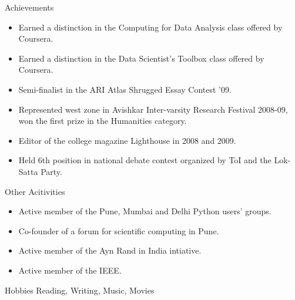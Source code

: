 \documentclass{resume} %
\begin{document}
\begin{rSection}{Achievements}
    \begin{itemize}
        \item Earned a distinction in the Computing for Data Analysis class
            offered by Coursera.
        \item Earned a distinction in the Data Scientist’s Toolbox class
            offered by Coursera.
        \item Semi-finalist in the ARI Atlas Shrugged Essay Contest ’09.
        \item Represented west zone in Avishkar Inter-varsity Research Festival
            2008-09, won the first prize in the Humanities category.
        \item Editor of the college magazine Lighthouse in 2008 and 2009.
        \item Held 6th position in national debate contest organized by ToI and
            the Lok-Satta Party.
    \end{itemize}
\end{rSection}

\begin{rSection}{Other Acitivities}
    \begin{itemize}
        \item Active member of the Pune, Mumbai and Delhi Python users' groups.
        \item Co-founder of a forum for scientific computing in Pune.
        \item Active member of the Ayn Rand in India intiative.
        \item Active member of the IEEE.
    \end{itemize}
\end{rSection}

\begin{rSection}{Hobbies}
    Reading, Writing, Music, Movies
\end{rSection}
\end{document}
